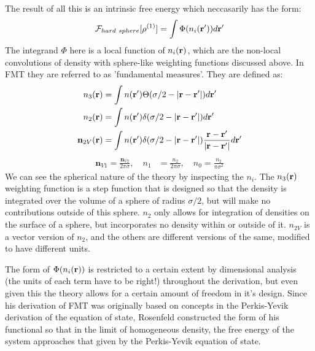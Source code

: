 The result of all this is an intrinsic free energy which neccasarily
has the form:
\begin{align}
  \label{eq:F-FMT-form}
  \mathcal{F}_{hard~sphere}[\rho^{(1)}] = \int \Phi({n_i(\textbf{r}')})d\textbf{r}'
\end{align}
The integrand $\Phi$ here is a local function of $n_i(\textbf{r})$, which are
the non-local convolutions of density with sphere-like weighting
functions discussed above.  In FMT they are referred to as
'fundamental measures'.  They are defined as:
\begin{align}
  n_3(\textbf{r}) &= \int n(\textbf{r}') \Theta(\sigma/2 -\left|\textbf{r} - \textbf{r}'\right|)
  d\textbf{r}' \label{eq:FMn3} \\
  n_2(\textbf{r}) &= \int n(\textbf{r}') \delta(\sigma/2 -\left|\textbf{r} - \textbf{r}'\right|) d\textbf{r}' \\
  \mathbf{n}_{2V}(\textbf{r}) &= \int n(\textbf{r}') \delta(\sigma/2 -\left|\textbf{r} - \textbf{r}'\right|) \frac{\textbf{r}-\textbf{r}'}{|\textbf{r}-\textbf{r}'|}d\textbf{r}'
\end{align}
\begin{align}
  \mathbf{n}_{V1} = \frac{\mathbf{n}_{V2}}{2\pi \sigma}, \quad
  n_1 &= \frac{n_2}{2\pi \sigma} , \quad
  n_0 = \frac{n_2}{\pi \sigma^2} \label{eq:FMrest}
\end{align}
We can see the spherical nature of the theory by inspecting the $n_i$.
The $n_3(\textbf{r})$ weighting function is a step function that is designed
so that the density is integrated over the volume of a sphere of
radius $\sigma/2$, but will make no contributions outside of this
sphere.  $n_2$ only allows for integration of densities on the surface
of a sphere, but incorporates no density within or outside of it.
$n_{2V}$ is a vector version of $n_2$, and the others are different
versions of the same, modified to have different units.
  
The form of $\Phi({n_i(\textbf{r})})$ is restricted to a certain extent by
dimensional analysis (the units of each term have to be right!)
throughout the derivation, but even given this the theory allows for a
certain amount of freedom in it's design.  Since his derivation of FMT
was originally based on concepts in the Perkis-Yevik derivation of the
equation of state, Rosenfeld constructed the form of his functional so
that in the limit of homogeneous density, the free energy of the
system approaches that given by the Perkis-Yevik equation of state.

